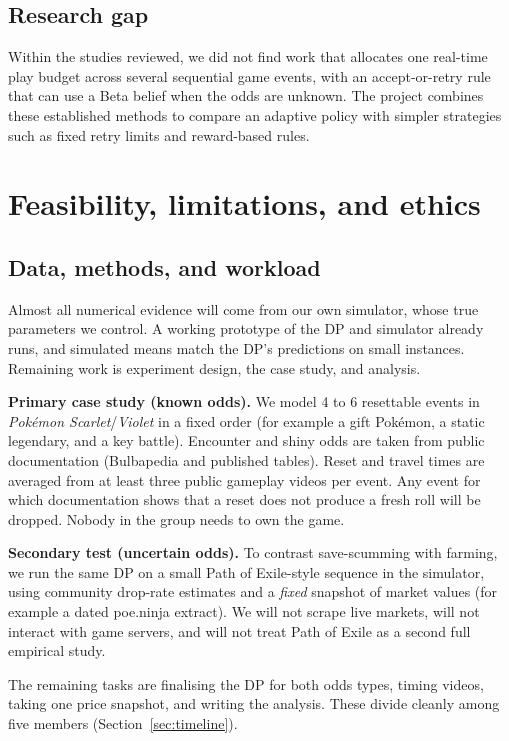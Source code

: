 \documentclass[11pt,a4paper]{article}
\begin{document}
\subsection{Research gap}
Within the studies reviewed, we did not find work that allocates one real-time play budget across several sequential game events, with an accept-or-retry rule that can use a Beta belief when the odds are unknown. The project combines these established methods to compare an adaptive policy with simpler strategies such as fixed retry limits and reward-based rules.

\section{Feasibility, limitations, and ethics}

\subsection{Data, methods, and workload}
Almost all numerical evidence will come from our own simulator, whose true parameters we control. A working prototype of the DP and simulator already runs, and simulated means match the DP's predictions on small instances. Remaining work is experiment design, the case study, and analysis.

\textbf{Primary case study (known odds).}
We model 4 to 6 resettable events in \emph{Pok\'emon Scarlet}/\emph{Violet} in a fixed order (for example a gift Pok\'emon, a static legendary, and a key battle). Encounter and shiny odds are taken from public documentation (Bulbapedia and published tables). Reset and travel times are averaged from at least three public gameplay videos per event. Any event for which documentation shows that a reset does not produce a fresh roll will be dropped. Nobody in the group needs to own the game.

\textbf{Secondary test (uncertain odds).}
To contrast save-scumming with farming, we run the same DP on a small Path of Exile-style sequence in the simulator, using community drop-rate estimates and a \emph{fixed} snapshot of market values (for example a dated poe.ninja extract). We will not scrape live markets, will not interact with game servers, and will not treat Path of Exile as a second full empirical study.

The remaining tasks are finalising the DP for both odds types, timing videos, taking one price snapshot, and writing the analysis. These divide cleanly among five members (Section~\ref{sec:timeline}).
\end{document}
